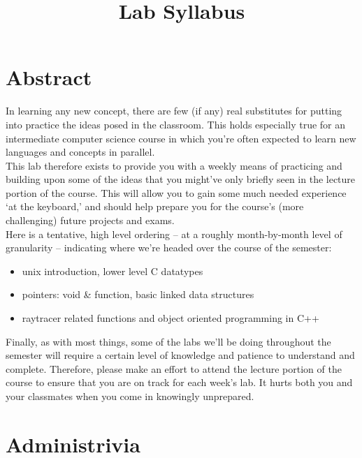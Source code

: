 \documentclass[12pt]{article}
\begin{document}
\title{\vspace{-.35in}Lab Syllabus}
\date{\empty}
\maketitle

\pagestyle{fancy}
\thispagestyle{fancy}

\vspace{-.75in}
\section{Abstract}

In learning any new concept, there are few (if any) real substitutes for putting into practice the ideas posed in the classroom. This holds especially true for an intermediate computer science course in which you're often expected to learn new languages and concepts in parallel. \\

\noindent This lab therefore exists to provide you with a weekly means of practicing and building upon some of the ideas that you might've only briefly seen in the lecture portion of the course. This will allow you to gain some much needed experience `at the keyboard,' and should help prepare you for the course's (more challenging) future projects and exams. \\

\noindent Here is a tentative, high level ordering -- at a roughly month-by-month level of granularity -- indicating where we're headed over the course of the semester:

\begin{itemize}
\item unix introduction, lower level C datatypes
\item pointers: void \& function, basic linked data structures
\item raytracer related functions and object oriented programming in C++
\end{itemize}

\noindent Finally, as with most things, some of the labs we'll be doing throughout the semester will require a certain level of knowledge and patience to understand and complete. Therefore, please make an effort to attend the lecture portion of the course to ensure that you are on track for each week's lab. It hurts both you and your classmates when you come in knowingly unprepared.

\section{Administrivia}
\end{document}
